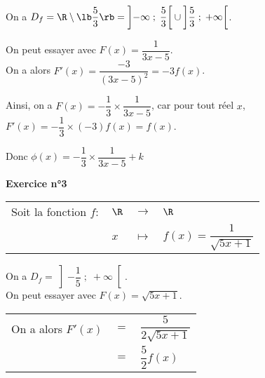 \vspace*{.3cm}

On a $D_f = \R \setminus \lb \dfrac{5}{3} \rb = \left]-\infty\; ; \; \dfrac{5}{3}\right[\cup\left]\dfrac{5}{3} \; ; \; +\infty\right[$.

\vspace*{.5cm}

On peut essayer avec $F(x) = \dfrac{1}{3x-5}$. \\

On a alors $F'(x) = \dfrac{-3}{\left(3x-5\right)^2} = -3f\left(x\right)$.

\vspace*{.3cm}

Ainsi, on a $F(x) = -\dfrac{1}{3}\times \dfrac{1}{3x-5}$, car pour tout réel $x$, $F'\left(x\right) = -\dfrac{1}{3}\times \left(-3\right)f\left(x\right) = f\left(x\right)$. 

\vspace*{.5cm}

Donc $\phi\left(x\right) = -\dfrac{1}{3} \times \dfrac{1}{3x-5} + k$ 

\newpage

\textbf{Exercice n°3} \\

\begin{tabular}{llll}
\hspace*{-.3cm} Soit la fonction $f:$ & $\R$ & $\longrightarrow$ & $\R$ \\
& $x$ & $\longmapsto$ & $f(x) = \dfrac{1}{\sqrt{5x+1}}$ \\
\end{tabular}

\vspace*{.3cm}

On a $D_f = \left] -\dfrac{1}{5} \; ; \; +\infty\right[$. \\

On peut essayer avec $F(x) = \sqrt{5x+1}$. \\

\begin{tabular}{lll}
\hspace*{-.3cm} On a alors $F'(x)$ & $=$ & $ \dfrac{5}{2\sqrt{5x+1}}$ \vspace*{.3cm} \\
& $=$ & $\dfrac{5}{2} f\left(x\right)$ \\
\end{tabular}

\vspace*{.5cm}

